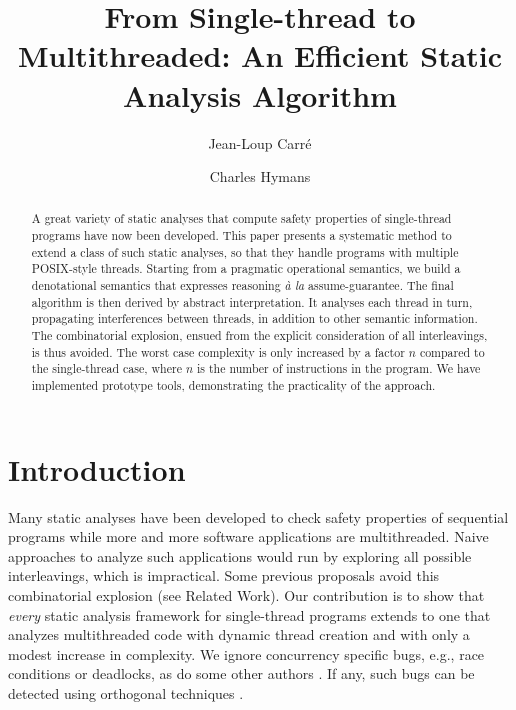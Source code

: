 \documentclass[12pt]{article}
\begin{document}
 \title{From Single-thread to Multithreaded: An Efficient Static Analysis Algorithm}

\author{
  Jean-Loup Carr\'e
   \and 
  Charles Hymans
}


\maketitle

\begin{abstract}
A great variety of static analyses that compute safety properties of single-thread programs have now been developed. This paper presents a systematic method to extend a class of such static analyses, so that they handle programs with multiple POSIX-style threads. Starting from a pragmatic operational semantics, we build a denotational semantics that expresses reasoning \textit{\`a la} assume-guarantee. The final algorithm is then derived by abstract interpretation. It analyses each thread in turn, propagating interferences between threads, in addition to other semantic information. The combinatorial explosion, ensued from the explicit consideration of all interleavings, is thus avoided. The worst case complexity is only increased by a factor $n$ compared to the single-thread case, where $n$ is the number of instructions in the program. We have implemented prototype tools, demonstrating the practicality of the approach.
\end{abstract}

\section{Introduction}

Many static analyses have been developed to check safety properties of sequential programs  \cite{mine:LCTES06,AllamigeonGodardHymansSAS06,steensgaard96pointsto,CousotCousot04-WCC,mine:padoII} while
more and more software applications are multithreaded. Naive approaches to analyze such applications would run by exploring all possible interleavings, which is impractical. Some previous proposals avoid this combinatorial explosion (see Related Work). Our contribution is to show that \emph{every} static analysis framework for single-thread programs extends to one that analyzes multithreaded code with dynamic thread creation and with only a modest increase in complexity.
We ignore concurrency specific bugs, e.g., race conditions or deadlocks, as do some other authors \cite{DBLP:conf/concur/LammichM07}. If any, such bugs can be detected using orthogonal techniques \cite{locksmith,701315}.
\end{document}
